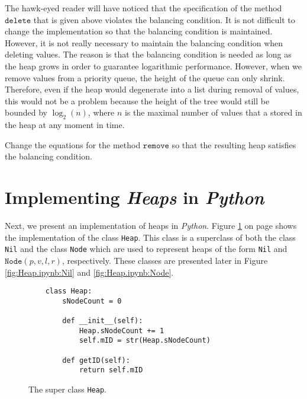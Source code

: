 The hawk-eyed reader will have noticed that the specification of the method $\texttt{delete}$ that is given
above violates the balancing condition.  It is not difficult to change the implementation so that
the balancing condition is maintained.  However, it is not really necessary to maintain the
balancing condition when deleting values.  The reason is that the balancing condition is needed as
long as the heap grows in order to guarantee logarithmic  performance.  However, when we remove
values from a priority queue, the height of the queue can only shrink.  Therefore, even if the heap
would degenerate into a list during removal of values, this would not be a problem because the
height of the tree would still be bounded by $\log_2(n)$, where $n$ is the maximal number of
values that a stored in the heap at any moment in time.

\exercise
Change the equations for the method $\texttt{remove}$ so that the resulting heap satisfies the
balancing condition.



\section[Implementation]{Implementing \textsl{Heaps} in \textsl{Python}}
Next, we present an implementation of heaps in \textsl{Python}.  Figure \ref{fig:Heap.ipynb:Heap} on page
\pageref{fig:Heap.ipynb:Heap} shows the implementation of the class  \texttt{Heap}.  This class is a superclass
of both the class \texttt{Nil} and the class \texttt{Node} which are used to represent heaps of the form
\texttt{Nil} and $\texttt{Node}(p, v, l, r)$, respectively.  These classes are presented later in Figure
\ref{fig:Heap.ipynb:Nil} and \ref{fig:Heap.ipynb:Node}.


\begin{figure}[!ht]
\centering
\begin{verbatim}
    class Heap:
        sNodeCount = 0
        
        def __init__(self):
            Heap.sNodeCount += 1
            self.mID = str(Heap.sNodeCount)
            
        def getID(self):
            return self.mID                 
\end{verbatim}
\vspace*{-0.3cm}
\caption{The super class \texttt{Heap}.}
\label{fig:Heap.ipynb:Heap}
\end{figure}

